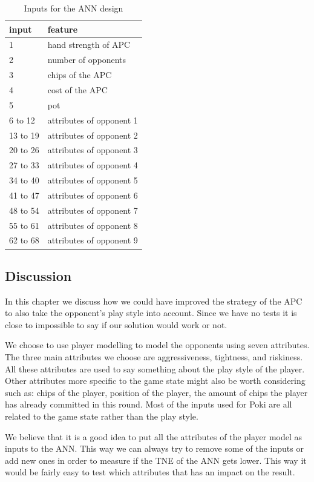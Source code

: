 \begin{table}[H]
\center
\begin{tabular}{ | l | l | }
\hline
input & feature \\
\hline
1 & hand strength of APC\\
2 & number of opponents\\
3 & chips of the APC\\
4 & cost of the APC\\
5 & pot\\
6 to 12 & attributes of opponent 1\\
13 to 19 & attributes of opponent 2\\
20 to 26 & attributes of opponent 3\\
27 to 33 & attributes of opponent 4\\
34 to 40 & attributes of opponent 5\\
41 to 47 & attributes of opponent 6\\
48 to 54 & attributes of opponent 7\\
55 to 61 & attributes of opponent 8\\
62 to 68 & attributes of opponent 9\\
\hline
\end{tabular}
\caption{Inputs for the ANN design \label{tab:ann-design}}
\end{table} 

\subsection{Discussion}
In this chapter we discuss how we could have improved the strategy of the APC to also take the opponent's play style into account. Since we have no tests it is close to impossible to say if our solution would work or not.

We choose to use player modelling to model the opponents using seven attributes. The three main attributes we choose are aggressiveness, tightness, and riskiness. All these attributes are used to say something about the play style of the player. Other attributes more specific to the game state might also be worth considering such as: chips of the player, position of the player, the amount of chips the player has already committed in this round.
Most of the inputs used for Poki are all related to the game state rather than the play style. 

We believe that it is a good idea to put all the attributes of the player model as inputs to the ANN. This way we can always try to remove some of the inputs or add new ones in order to measure if the TNE of the ANN gets lower. This way it would be fairly easy to test which attributes that has an impact on the result. 

